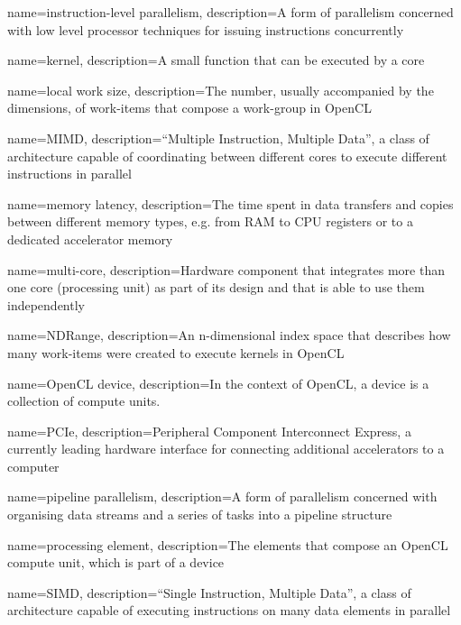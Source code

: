{
    name={instruction-level parallelism},
    description={A form of parallelism concerned with low level processor techniques for issuing instructions concurrently}
}

{
    name={kernel},
    description={A small function that can be executed by a core}
}

{
    name={local work size},
    description={The number, usually accompanied by the dimensions, of work-items that compose a work-group in OpenCL}
}

{
    name={MIMD},
    description={``Multiple Instruction, Multiple Data'', a class of architecture capable of coordinating between different cores to execute different instructions in parallel}
}

{
    name={memory latency},
    description={The time spent in data transfers and copies between different memory types, e.g. from RAM to CPU registers or to a dedicated accelerator memory}
}

{
    name=multi-core,
    description={Hardware component that integrates more than one core (processing unit) as part of its design and that is able to use them independently}
}

{
    name=NDRange,
    description={An n-dimensional index space that describes how many work-items were created to execute kernels in OpenCL}
}

{
    name={OpenCL device},
    description={In the context of OpenCL, a device is a collection of compute units.}
}

{
    name={PCIe},
    description={Peripheral Component Interconnect Express, a currently leading hardware interface for connecting additional accelerators to a computer}
}

{
    name={pipeline parallelism},
    description={A form of parallelism concerned with organising data streams and a series of tasks into a pipeline structure}
}

{
    name={processing element},
    description={The elements that compose an OpenCL compute unit, which is part of a device}
}

{
    name={SIMD},
    description={``Single Instruction, Multiple Data'', a class of architecture capable of executing instructions on many data elements in parallel}
}

